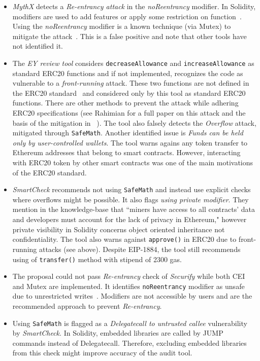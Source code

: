 \begin{itemize}
	\item \textit{MythX} detects a \textit{Re-entrancy attack} in the \textit{noReentrancy} modifier. In Solidity, modifiers are used to add features or apply some restriction on function~\cite{SolidityModifer}. Using the \textit{noReentrancy} modifier is a known technique (via Mutex) to mitigate the attack~\cite{ReentrancyGuard}. This is a false positive and note that other tools have not identified it.
	\item The \textit{EY review tool} considers \texttt{decreaseAllowance} and \texttt{increaseAllowance} as standard ERC20 functions and if not implemented, recognizes the code as vulnerable to a \textit{front-running} attack. These two functions are not defined in the ERC20 standard~\cite{ERC20Std} and considered only by this tool as standard ERC20 functions. There are other methods to prevent the attack while adhering ERC20 specifications (see Rahimian \etal for a full paper on this attack and the basis of the mitigation in \sys~\cite{ERC20MWA}). The tool also falsely detects the \textit{Overflow} attack, mitigated through \texttt{SafeMath}. Another identified issue is \textit{Funds can be held only by user-controlled wallets}. The tool warns agains any token transfer to Ethereum addresses that belong to smart contracts. However, interacting with ERC20 token by other smart contracts was one of the main motivations of the ERC20 standard.
	\item \textit{SmartCheck} recommends not using \texttt{SafeMath} and instead use explicit checks where overflows might be possible. It also flags \textit{using private modifier}. They mention in the knowledge-base that ``miners have access to all contracts’ data and developers must account for the lack of privacy in Ethereum," however private visibility in Solidity concerns object oriented inheritance not confidentiality. The tool also warns against \texttt{approve()} in ERC20 due to front-running attacks (see above). Despite EIP-1884, the tool still recommends using of \texttt{transfer()} method with stipend of 2300 gas.
	\item The proposal could not pass \textit{Re-entrancy} check of \textit{Securify} while both CEI and Mutex are implemented. It identifies \texttt{noReentrancy} modifier as unsafe due to unrestricted writes~\cite{SECURIFY}. Modifiers are not accessible by users and are the recommended approach to prevent \textit{Re-entrancy}.
	\item Using \texttt{SafeMath} is flagged as a \textit{Delegatecall to untrusted callee} vulnerability by \textit{SmartCheck}. In Solidity, embedded libraries are called by JUMP commands instead of Delegatecall. Therefore, excluding embedded libraries from this check might improve accuracy of the audit tool.
\end{itemize}


